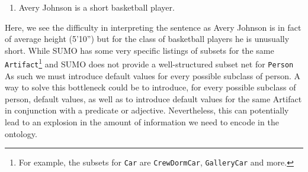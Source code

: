 \documentclass[11pt]{article}
\begin{document}
\begin{enumerate}
    \item Avery Johnson is a short basketball player. \label{ex:avery}
\end{enumerate}

Here, we see the difficulty in interpreting the sentence as Avery Johnson is in fact of average height (5'10'') but
for the class of basketball players he is unusually short. While SUMO has some very specific listings of subsets for the same \texttt{Artifact}\footnote{For example, the subsets for \texttt{Car} are \texttt{CrewDormCar}, \texttt{GalleryCar} and more.} %
and SUMO does not provide a well-structured subset net for \texttt{Person}%
As such we must introduce default values for
every possible subclass of person. A way to solve this bottleneck could be to introduce, for every possible subclass of person, default values, as well as to introduce default values for the same Artifact in conjunction with a predicate or adjective. Nevertheless, this can potentially lead to an explosion in the amount of information we
need to encode in the ontology.
\end{document}
